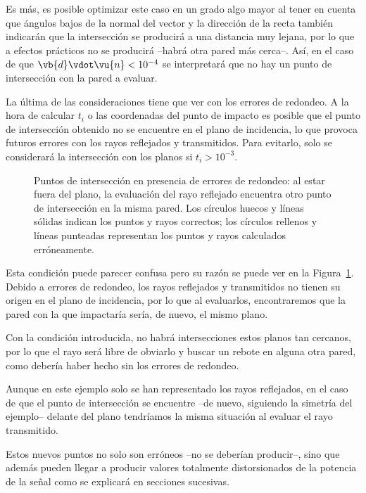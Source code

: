 Es más, es posible optimizar este caso en un grado algo mayor al tener en cuenta que ángulos bajos de la normal del vector y la dirección de la recta también indicarán que la intersección se producirá a una distancia muy lejana, por lo que a efectos prácticos no se producirá --habrá otra pared más cerca--.
Así, en el caso de que $\vb{d}\vdot\vu{n} < 10^{-4}$ se interpretará que no hay un punto de intersección con la pared a evaluar.

La última de las consideraciones tiene que ver con los errores de redondeo.
A la hora de calcular $t_i$ o las coordenadas del punto de impacto es posible que el punto de intersección obtenido no se encuentre en el plano de incidencia, lo que provoca futuros errores con los rayos reflejados y transmitidos.
Para evitarlo, solo se considerará la intersección con los planos si $t_i > 10^{-3}$.

\begin{figure}[H]
    \centering
    
    \caption{Puntos de intersección en presencia de errores de redondeo: al estar fuera del plano, la evaluación del rayo reflejado encuentra otro punto de intersección en la misma pared. Los círculos huecos y líneas sólidas indican los puntos y rayos correctos; los círculos rellenos y líneas punteadas representan los puntos y rayos calculados erróneamente.}
    \label{fig:condicion_interseccion}
\end{figure}

Esta condición puede parecer confusa pero su razón se puede ver en la Figura~\ref{fig:condicion_interseccion}.
Debido a errores de redondeo, los rayos reflejados y transmitidos no tienen su origen en el plano de incidencia, por lo que al evaluarlos, encontraremos que la pared con la que impactaría sería, de nuevo, el mismo plano.

Con la condición introducida, no habrá intersecciones estos planos tan cercanos, por lo que el rayo será libre de obviarlo y buscar un rebote en alguna otra pared, como debería haber hecho sin los errores de redondeo.

Aunque en este ejemplo solo se han representado los rayos reflejados, en el caso de que el punto de intersección se encuentre --de nuevo, siguiendo la simetría del ejemplo-- delante del plano tendríamos la misma situación al evaluar el rayo transmitido.

Estos nuevos puntos no solo son erróneos --no se deberían producir--, sino que además pueden llegar a producir valores totalmente distorsionados de la potencia de la señal como se explicará en secciones sucesivas.

